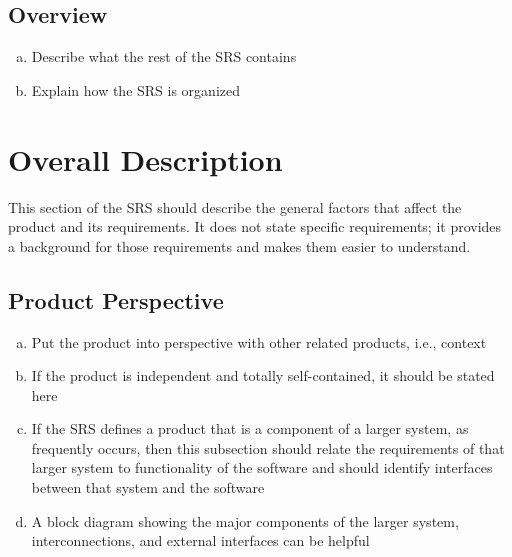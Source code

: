 \documentclass[]{article}
\begin{document}
\subsection{Overview}
\label{sub:overview}
\begin{enumerate}[a)]
	\item Describe what the rest of the SRS contains
	\item Explain how the SRS is organized
\end{enumerate}


\section{Overall Description}
\label{sec:overall_description}

This section of the SRS should describe the general factors that affect the product and its requirements. It does not state specific requirements; it provides a background for those requirements and makes them easier to understand.

\subsection{Product Perspective}
\label{sub:product_perspective}
\begin{enumerate}[a)]
	\item Put the product into perspective with other related products, i.e., context
	\item If the product is independent and totally self-contained, it should be stated here
	\item If the SRS defines a product that is a component of a larger system, as frequently occurs, then this subsection should relate the requirements of that larger system to functionality of the software and should identify interfaces between that system and the software
	\item A block diagram showing the major components of the larger system, interconnections, and external interfaces can be helpful
\end{enumerate}
\end{document}
